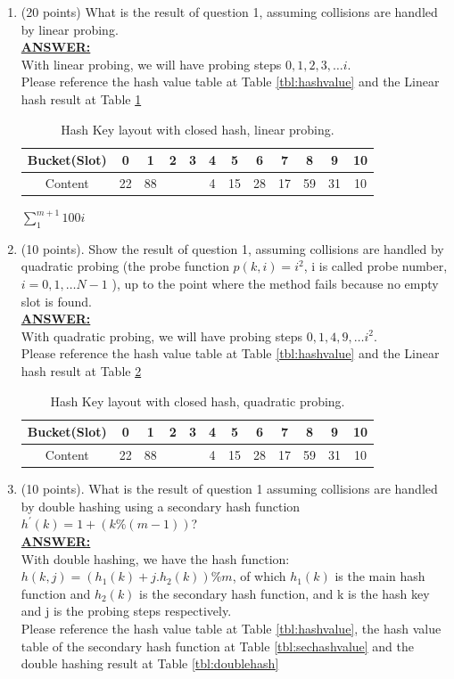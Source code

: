 \documentclass{article}
\newcommand{\answer}{\textbf{\\\underline{ANSWER:}\\}}
\begin{document}
\begin{enumerate}
\item(20 points) What is the result of question 1, assuming collisions
  are handled by linear probing.
\answer With linear probing, we will have probing steps $0, 1, 2, 3,
\ldots i$. \\
Please reference the hash value table at Table
\ref{tbl:hashvalue} and the Linear hash result at Table
\ref{tbl:linearhash} 

\begin{table}[H]
  \begin{center}
    \begin{tabular}{|c|c|c|c|c|c|c|c|c|c|c|c|} 
      \hline Bucket(Slot)&0&1&2&3&4&5&6&7&8&9&10 \\
      \hline 
      Content &22&88& & &4&15&28&17&59&31&10 \\
      \hline
    \end{tabular}
    \caption{Hash Key layout with closed hash, linear
      probing. \label{tbl:linearhash}}
    \vspace{-15pt}
  \end{center}
\end{table}
$\sum_1^{m+1}100i$
\item(10 points). Show the result of question 1, assuming collisions
  are handled by quadratic probing (the probe function $p(k,i) = i^2$,
  i is called probe number, $i=0, 1,\ldots N-1$ ),  up to the point where
  the method fails because no empty slot is found. 
\answer With quadratic probing, we will have probing steps $0, 1, 4, 9,
\ldots i^2$. \\
Please reference the hash value table at Table
\ref{tbl:hashvalue} and the Linear hash result at Table \ref{tbl:quadhash}
\begin{table}[H]
  \begin{center}
    \begin{tabular}{|c|c|c|c|c|c|c|c|c|c|c|c|} 
      \hline Bucket(Slot)&0&1&2&3&4&5&6&7&8&9&10 \\
      \hline 
      Content &22&88& & &4&15&28&17&59&31&10 \\
      \hline
    \end{tabular}
    \caption{Hash Key layout with closed hash, quadratic
      probing. \label{tbl:quadhash}}
    \vspace{-15pt}
  \end{center}
\end{table}

\item(10 points). What is the result of question 1 assuming collisions
  are handled by double hashing using a secondary hash function 
  $h^\prime (k) = 1 + (k \% (m-1))$?
\answer With double hashing, we have the hash function:
$h(k,j)=(h_1(k)+j.h_2(k))\%m$, of which $h_1(k)$ is the main hash
function and $h_2(k)$ is the secondary hash function, and k is the
hash key and j is the probing steps respectively. \\
Please reference the hash value table at Table
\ref{tbl:hashvalue}, the hash value table of the secondary hash
function at Table \ref{tbl:sechashvalue} and the double hashing result at
Table \ref{tbl:doublehash} 


\end{enumerate}
\end{document}
